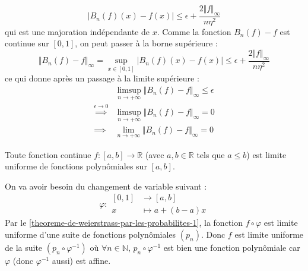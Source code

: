 \begin{demonstration}
		\[ |B_n(f)(x) - f(x)| \leq \epsilon + \frac{2 \Vert f \Vert_\infty}{n \eta^2} \]
		qui est une majoration indépendante de $x$. Comme la fonction $B_n(f) - f$ est continue sur $[0, 1]$, on peut passer à la borne supérieure :
		\[ \Vert B_n(f) - f \Vert_\infty = \sup_{x \in [0, 1]} |B_n(f)(x) - f(x)| \leq \epsilon + \frac{2 \Vert f \Vert_\infty}{n \eta^2} \]
		ce qui donne après un passage à la limite supérieure :
		\begin{align*}
			&\limsup_{n \rightarrow +\infty} \Vert B_n(f) - f \Vert_\infty \leq \epsilon \\
			\overset{\epsilon \longrightarrow 0}{\implies} &\limsup_{n \rightarrow +\infty} \Vert B_n(f) - f \Vert_\infty = 0 \\
			\implies &\lim_{n \rightarrow +\infty} \Vert B_n(f) - f \Vert_\infty = 0
		\end{align*}
	\end{demonstration}

	\begin{theorem}[Weierstrass]
		Toute fonction continue $f : [a,b] \rightarrow \mathbb{R}$ (avec $a, b \in \mathbb{R}$ tels que $a \leq b$) est limite uniforme de fonctions polynômiales sur $[a, b]$.
	\end{theorem}

	\begin{demonstration}
		On va avoir besoin du changement de variable suivant :
		\[ \varphi :
		\begin{array}{cl}
			[0,1] &\rightarrow [a, b] \\
			x &\mapsto a + (b-a) x
		\end{array}
		\]
		Par le \cref{theoreme-de-weierstrass-par-les-probabilites-1}, la fonction $f \circ \varphi$ est limite uniforme d'une suite de fonctions polynômiales $(p_n)$. Donc $f$ est limite uniforme de la suite $(p_n \circ \varphi^{-1})$ où $\forall n \in \mathbb{N}$, $p_n \circ \varphi^{-1}$ est bien une fonction polynômiale car $\varphi$ (donc $\varphi^{-1}$ aussi) est affine.
	\end{demonstration}

